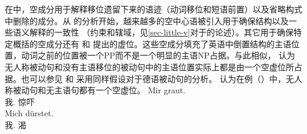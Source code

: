 在\gbtc 中，空成分用于解释移位遗留下来的语迹（动词移位和短语前置）以及省略构式中删除的成分。从 \citet{Larson88a}的分析开始，越来越多的空中心语被引入用于确保结构以及一些语义解释的一致性 （约束和辖域，见\ref{sec-little-v}对于\littlevc 的论述）。其它用于确保特定概括的空成分还有 \citet[]{Coopmans-89a-u}和 \citet[Chapter~1]{Postal2004a-u}提出的虚位。这些空成分填充了英语中倒置结构的主语位置，动词之前的位置被一个PP而不是一个明显的主语NP占据。与此相似， \citet[]{Grewendorf93}认为无人称被动句和没有主语移位的被动句中的主语位置实际上都是由一个空虚位所占据。也可以参见 和 \citet[]{Lohnstein2014a}采用同样假设对于德语被动句的分析。 \citet[\S~II.3.3.3]{Sternefeld2006a-u}认为在例（）中，无人称被动句和无主语句都有一个空虚位。
\eal
\ex 
\gll Mir graut.\\
	 我.\dat{} 惊吓\\
\ex 
\gll Mich dürstet.\\
	我.\acc{} 渴\\
\zl


